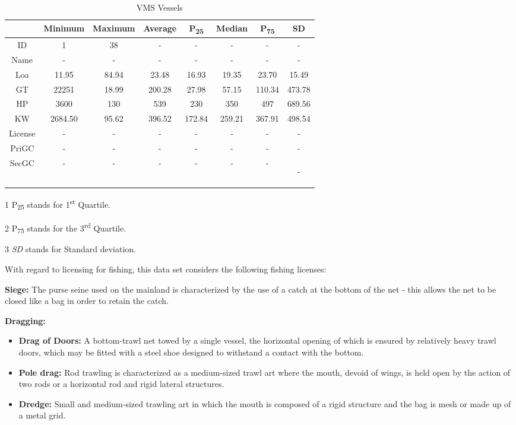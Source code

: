 \begin {table}[H]
\centering
\begin{threeparttable}
\caption {VMS Vessels}
\small

\begin{tabular}{c|c|c|c|c|c|c|c}
& Minimum & Maximum & Average & P\textsubscript{25} & Median & P\textsubscript{75} & SD \\
\hline
ID & 1&38&-&-&-&-&-\\
Name &-&-&-&-&-&-&-\\
Loa & 11.95&84.94&23.48&16.93&19.35&23.70&15.49\\
GT &22251&18.99&200.28&27.98&57.15&110.34&473.78\\
HP & 3600&130&539&230&350&497&689.56\\
KW &2684.50&95.62&396.52&172.84&259.21&367.91&498.54\\
License &-&-&-&-&-&-&-\\
PriGC &-&-&-&-&-&-&-\\
SecGC &-&-&-&-&-&-&-

\label{table:vms_vessels}
\end{tabular}

	\begin{tablenotes}
        \item[1] P\textsubscript{25} stands for 1\textsuperscript{st} Quartile. 
        \item[2] P\textsubscript{75} stands for the 3\textsuperscript{rd} Quartile. 
        \item[3] \textit{SD} stands for Standard deviation. 
    \end{tablenotes}
    \end{threeparttable}
\end {table}

With regard to licensing for fishing, this data set considers the following fishing licenses:

 \textbf{ Siege:}
The purse seine used on the mainland is characterized by the use of a catch at the bottom of the net - this allows the net to be closed like a bag in order to retain the catch.

\textbf{Dragging:}
\begin{itemize}


\item \textbf{Drag of Doors: }A bottom-trawl net towed by a single vessel, the horizontal opening of which is ensured by relatively heavy trawl doors, which may be fitted with a steel shoe designed to withstand a contact with the bottom.
\item \textbf{Pole drag:} Rod trawling is characterized as a medium-sized trawl art where the mouth, devoid of wings, is held open by the action of two rods or a horizontal rod and rigid lateral structures.
\item \textbf{Dredge:} Small and medium-sized trawling art in which the mouth is composed of a rigid structure and the bag is mesh or made up of a metal grid.
\end{itemize}


